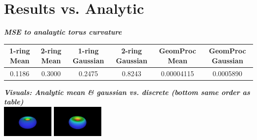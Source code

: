 \documentclass{article}
\renewcommand{\i}[1]{\textit{{#1}}}
\renewcommand{\b}[1]{\textbf{{#1}}}
\begin{document}
\section{Results vs. Analytic}
\begin{center}
\b{\i{MSE to analaytic torus curvature}}
\smallbreak
\begin{tabular}{|c|c|c|c|c|c|}
    \hline
    1-ring Mean & 2-ring Mean & 1-ring Gaussian & 2-ring Gaussian & GeomProc
    Mean & GeomProc Gaussian\\
    \hline
    0.1186 &  0.3000 & 0.2475 & 0.8243 & 0.00004115 & 0.0005890\\
    \hline
\end{tabular}
\end{center}


\begin{center}
\b{\i{Visuals: Analytic mean \& gaussian vs. discrete (bottom same order as table)}}\\
\smallbreak
\includegraphics[width=1.0in]{torus_analytic_m00.png}
\includegraphics[width=1.0in]{torus_analytic.png}
\end{center}

\bigbreak
\end{document}
